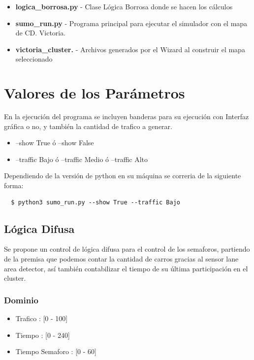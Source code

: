 \documentclass{article}
\begin{document}
\begin{itemize}
\item \textbf{logica\_borrosa.py} - Clase Lógica Borrosa donde se hacen los cálculos
\item \textbf{sumo\_run.py} - Programa principal para ejecutar el simulador con el mapa de CD. Victoria.
\item \textbf{victoria\_cluster.\*} - Archivos generados por el Wizard al construir el mapa seleccionado
\end{itemize}


\newpage
\section{Valores de los Parámetros}

En la ejecución del programa se incluyen banderas para su ejecución con Interfaz gráfica o no, y también la cantidad de trafico a generar.

\begin{itemize}
\item --show True ó --show False
\item --traffic Bajo ó --traffic Medio ó --traffic Alto
\end{itemize}

Dependiendo de la versión de python en su máquina se correria de la siguiente forma:

\begin{commandline}
 \begin{verbatim}
  $ python3 sumo_run.py --show True --traffic Bajo
 \end{verbatim}
\end{commandline}

\subsection{Lógica Difusa}

Se propone un control de lógica difusa para el control de los semaforos, partiendo de la premisa que podemos contar la cantidad de carros gracias al sensor lane area detector, así también contabilizar el tiempo de su última participación en el cluster.\\

\subsubsection{Dominio}
\begin{itemize}
\item Trafico : [0 - 100]
\item Tiempo  : [0 - 240]
\item Tiempo Semaforo : [0 - 60]
\end{itemize}
\end{document}
